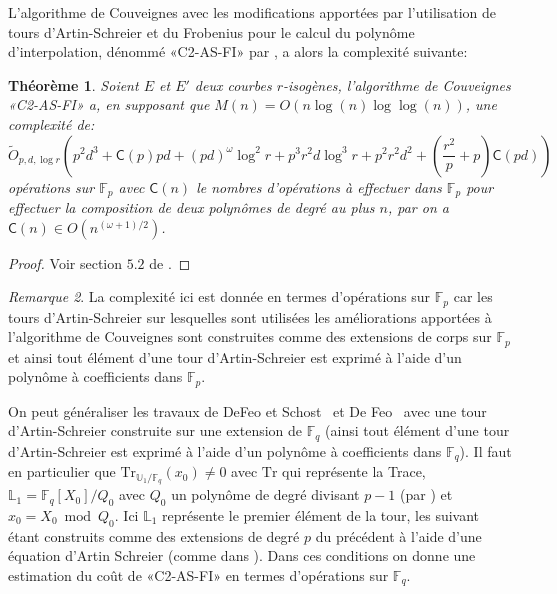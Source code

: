 \documentclass[10pt,a4paper]{book}
\theoremstyle{plain}
\newtheorem{thm}{Théorème}[chapter]
\theoremstyle{definition}
\theoremstyle{definition}
\theoremstyle{definition}
\theoremstyle{definition}
\theoremstyle{definition}
\theoremstyle{remark}
\newtheorem{rem}[thm]{Remarque}
\theoremstyle{remark}
\theoremstyle{definition}
\begin{document}
L'algorithme de Couveignes avec les modifications apportées par l'utilisation 
de tours d'Artin-Schreier et du Frobenius pour le calcul du polynôme 
d'interpolation, dénommé «C2-AS-FI» par \cite{DeFeo11}, a alors la complexité 
suivante:

\begin{thm}
\label{thm:C2:FP}
Soient $E$ et $E'$ deux courbes $r$-isogènes, l'algorithme de Couveignes 
«C2-AS-FI» a, en supposant que $M(n)=O(n \log(n) \log \log (n))$, une complexité
de:
\[
\tilde{O}_{p,d,\log r}(p^2d^3+\mathsf{C}(p)pd+(pd)^{\omega}\log^2 r + p^3 r^2 d \log^3 r + p^2r^2d^2+(\frac{r^2}{p}+p)\mathsf{C}(pd))
\]
opérations sur $\mathbb{F}_p$ avec $\mathsf{C}(n)$ le nombres d'opérations à effectuer dans $\mathbb{F}_p$ pour effectuer la composition de deux polynômes de degré au plus $n$, par \cite{BrentKung78} on a $\mathsf{C}(n) \in O(n^{(\omega+1)/2})$.
\end{thm}

\begin{proof}
Voir section $5.2$ de \cite{DeFeo11}.
\end{proof}

\begin{rem}
La complexité ici est donnée en termes d'opérations sur $\mathbb{F}_p$ car les 
tours d'Artin-Schreier sur lesquelles sont utilisées les améliorations 
apportées à l'algorithme de Couveignes sont construites comme des extensions de
corps sur $\mathbb{F}_p$ et ainsi tout élément d'une tour d'Artin-Schreier est
exprimé à l'aide d'un polynôme à coefficients dans $\mathbb{F}_p$.
\end{rem}

On peut généraliser les travaux de DeFeo et Schost~\cite{DeFeo-Shost'12} et 
De Feo~\cite{DeFeo11} avec une tour d'Artin-Schreier construite sur une 
extension de $\mathbb{F}_q$ (ainsi tout élément d'une tour d'Artin-Schreier est
exprimé à l'aide d'un polynôme à coefficients dans $\mathbb{F}_q$). Il faut en 
particulier que $\mathrm{Tr}_{\mathbb{U}_1/\mathbb{F}_q}(x_0) \neq 0$ avec 
$\mathrm{Tr}$ qui représente la Trace, $\mathbb{L}_1=\mathbb{F}_q[X_0]/Q_0$ 
avec $Q_0$ un polynôme de degré divisant $p-1$ (par \cite{Gunji76}) et 
$x_0=X_0 \bmod Q_0$. Ici $\mathbb{L}_1$ représente le premier élément de la 
tour, les suivant étant construits comme des extensions de degré $p$ du 
précédent à l'aide d'une équation d'Artin Schreier (comme dans 
\cite{DeFeo-Shost'12}). Dans ces conditions on donne une estimation du coût de 
«C2-AS-FI» en termes d'opérations sur $\mathbb{F}_q$.
\end{document}
